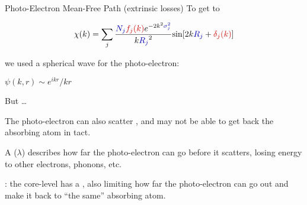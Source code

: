 
\begin{slide}{Photo-Electron Mean-Free Path (extrinsic losses)}
  To get to

    \[ \chi(k) = \sum_j {\frac{{\Blue{N_j}} {\Red{f_j(k)}}
        e^{-2k^2{\Blue{\sigma_j^2}}}}{k{\Blue{R_j}}^2}
      {\sin[{2k{\Blue{R_j}} + {\Red{\delta_j(k)}}] }}} \]

 we used a spherical wave for the photo-electron:

  \begin{center}
      \begin{minipage}{40mm}
        {$\displaystyle        \psi(k,r) \sim   {{e^{ikr}}/{kr}}  $}
      \end{minipage}
  \end{center}


 But \ldots   \vmm \pause

  \begin{minipage}{100mm}

    The photo-electron can also scatter {}, and may
    not be able to get back the absorbing atom in tact.

  \vmm

  A {} ($\lambda$) describes how far the
  photo-electron can go before it scatters, losing energy to other
  electrons, phonons, etc.

  \pause \vmm

  {}: the core-level has a {},
  also limiting how far the photo-electron can go out and make it back to
  ``the same'' absorbing atom.

  \end{minipage}


  \vfill
\end{slide}


